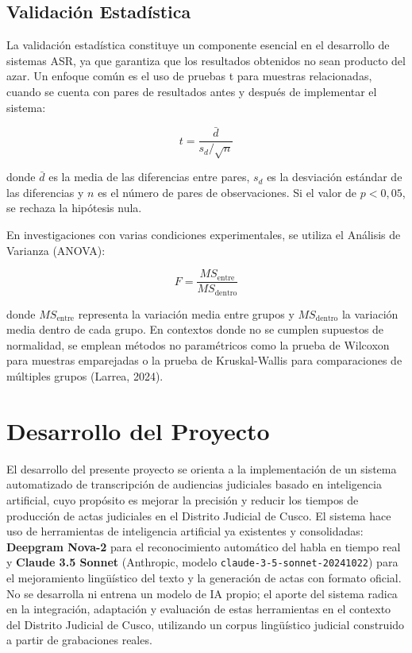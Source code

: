 \documentclass[12pt,a4paper,oneside]{report}
\begin{document}
\subsection{Validación Estadística}

La validación estadística constituye un componente esencial en el desarrollo de sistemas ASR, ya que garantiza que los resultados obtenidos no sean producto del azar. Un enfoque común es el uso de pruebas t para muestras relacionadas, cuando se cuenta con pares de resultados antes y después de implementar el sistema:

\begin{equation}
t = \frac{\bar{d}}{s_d / \sqrt{n}}
\end{equation}

donde $\bar{d}$ es la media de las diferencias entre pares, $s_d$ es la desviación estándar de las diferencias y $n$ es el número de pares de observaciones. Si el valor de $p < 0{,}05$, se rechaza la hipótesis nula.

En investigaciones con varias condiciones experimentales, se utiliza el Análisis de Varianza (ANOVA):

\begin{equation}
F = \frac{MS_{\text{entre}}}{MS_{\text{dentro}}}
\end{equation}

donde $MS_{\text{entre}}$ representa la variación media entre grupos y $MS_{\text{dentro}}$ la variación media dentro de cada grupo. En contextos donde no se cumplen supuestos de normalidad, se emplean métodos no paramétricos como la prueba de Wilcoxon para muestras emparejadas o la prueba de Kruskal-Wallis para comparaciones de múltiples grupos (Larrea, 2024).

\section{Desarrollo del Proyecto}

El desarrollo del presente proyecto se orienta a la implementación de un sistema automatizado de transcripción de audiencias judiciales basado en inteligencia artificial, cuyo propósito es mejorar la precisión y reducir los tiempos de producción de actas judiciales en el Distrito Judicial de Cusco. El sistema hace uso de herramientas de inteligencia artificial ya existentes y consolidadas: \textbf{Deepgram Nova-2} para el reconocimiento automático del habla en tiempo real y \textbf{Claude 3.5 Sonnet} (Anthropic, modelo \texttt{claude-3-5-sonnet-20241022}) para el mejoramiento lingüístico del texto y la generación de actas con formato oficial. No se desarrolla ni entrena un modelo de IA propio; el aporte del sistema radica en la integración, adaptación y evaluación de estas herramientas en el contexto del Distrito Judicial de Cusco, utilizando un corpus lingüístico judicial construido a partir de grabaciones reales.
\end{document}
